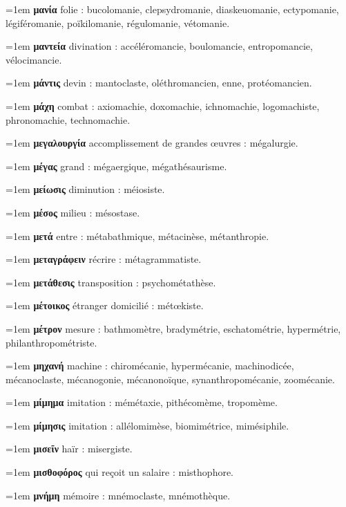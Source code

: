 \hangindent=1em \textbf{μανία} folie : bucolomanie, clepsydromanie, diaskeuomanie, ectypomanie, légiféromanie, poïkilomanie, régulomanie, vétomanie.\par
\hangindent=1em \textbf{μαντεία} divination : accéléromancie, boulomancie, entropomancie, vélocimancie.\par
\hangindent=1em \textbf{μάντις} devin : mantoclaste, oléthromancien, enne, protéomancien.\par
\hangindent=1em \textbf{μάχη} combat : axiomachie, doxomachie, ichnomachie, logomachiste, phronomachie, technomachie.\par
\hangindent=1em \textbf{μεγαλουργία} accomplissement de grandes œuvres : mégalurgie.\par
\hangindent=1em \textbf{μέγας} grand : mégaergique, mégathésaurisme.\par
\hangindent=1em \textbf{μείωσις} diminution : méiosiste.\par
\hangindent=1em \textbf{μέσος} milieu : mésostase.\par
\hangindent=1em \textbf{μετά} entre : métabathmique, métacinèse, métanthropie.\par
\hangindent=1em \textbf{μεταγράφειν} récrire : métagrammatiste.\par
\hangindent=1em \textbf{μετάθεσις} transposition : psychométathèse.\par
\hangindent=1em \textbf{μέτοικος} étranger domicilié : métœkiste.\par
\hangindent=1em \textbf{μέτρον} mesure : bathmomètre, bradymétrie, eschatométrie, hypermétrie, philanthropométriste.\par
\hangindent=1em \textbf{μηχανή} machine : chiromécanie, hypermécanie, machinodicée, mécanoclaste, mécanogonie, mécanonoïque, synanthropomécanie, zoomécanie.\par
\hangindent=1em \textbf{μίμημα} imitation : mémétaxie, pithécomème, tropomème.\par
\hangindent=1em \textbf{μίμησις} imitation : allélomimèse, biomimétrice, mimésiphile.\par
\hangindent=1em \textbf{μισεῖν} haïr : misergiste.\par
\hangindent=1em \textbf{μισθοφόρος} qui reçoit un salaire : misthophore.\par
\hangindent=1em \textbf{μνήμη} mémoire : mnémoclaste, mnémothèque.\par
